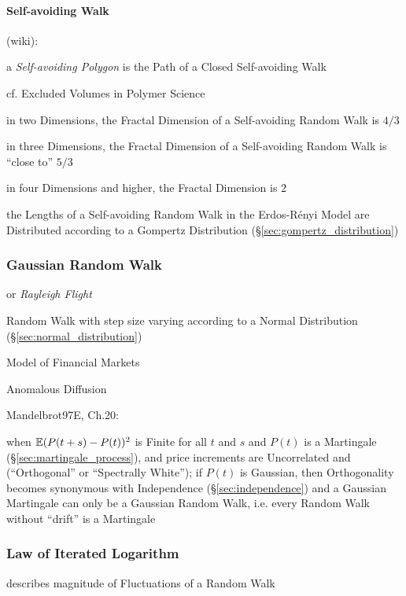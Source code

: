 \paragraph{Self-avoiding Walk}\label{sec:selfavoiding_walk}\hfill

(wiki):

a \emph{Self-avoiding Polygon} is the Path of a Closed Self-avoiding Walk

cf. Excluded Volumes in Polymer Science

in two Dimensions, the Fractal Dimension of a Self-avoiding Random Walk is $4/3$

in three Dimensions, the Fractal Dimension of a Self-avoiding Random Walk is
``close to'' $5/3$

in four Dimensions and higher, the Fractal Dimension is $2$

the Lengths of a Self-avoiding Random Walk in the Erdos-R\'enyi Model are
Distributed according to a Gompertz Distribution
(\S\ref{sec:gompertz_distribution})



\subsubsection{Gaussian Random Walk}\label{sec:gaussian_random_walk}

or \emph{Rayleigh Flight}

Random Walk with step size varying according to a Normal Distribution
(\S\ref{sec:normal_distribution})

Model of Financial Markets

Anomalous Diffusion

Mandelbrot97E, Ch.20:

when $\mathbb{E}(P(t + s) - P(t))^2$ is Finite for all $t$ and $s$ and $P(t)$ is a
Martingale (\S\ref{sec:martingale_process}), and price increments are
Uncorrelated and (``Orthogonal'' or ``Spectrally White''); if $P(t)$ is
Gaussian, then Orthogonality becomes synonymous with Independence
(\S\ref{sec:independence}) and a Gaussian Martingale can only be a Gaussian
Random Walk, i.e. every Random Walk without ``drift'' is a Martingale



\subsubsection{Law of Iterated Logarithm}\label{sec:iterated_logarithm}

describes magnitude of Fluctuations of a Random Walk

